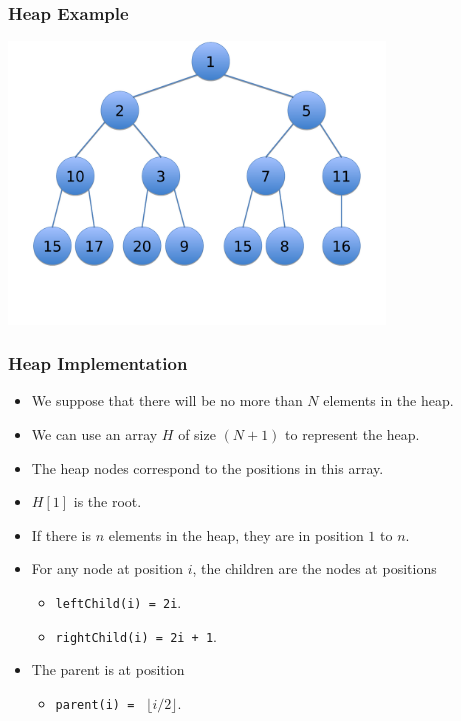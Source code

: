 \documentclass{beamer}
\begin{document}
\begin{frame}[containsverbatim]
\frametitle{Heap Example}

\begin{center}
\includegraphics[width=10cm]{heap.pdf}%
\end{center}

\end{frame}

\begin{frame}%
\frametitle{Heap Implementation}

\begin{itemize}
\item We suppose that there will be no more than $N$ elements in the heap.
\vspace{0.1cm}
\item<2-> We can use an array $H$ of size $(N+1)$ to represent the heap.
\vspace{0.1cm}
\item<3-> The heap nodes correspond to the positions in this array.
\vspace{0.1cm}
\item<4-> $H[1]$ is the root.
\vspace{0.1cm}
\item<5-> If there is $n$ elements in the heap, they are in position $1$ to $n$.
\vspace{0.1cm}
\item<6-> For any node at position $i$, the children are the nodes at positions
\begin{itemize}
\item \texttt{leftChild(i) = 2i}.
\item \texttt{rightChild(i) = 2i + 1}.
\end{itemize}
\vspace{0.1cm}
\item<7-> The parent is at position
\begin{itemize}
\item \texttt{parent(i) = } $\lfloor i/2 \rfloor$.
\end{itemize}

\end{itemize}

\end{frame}
\end{document}
